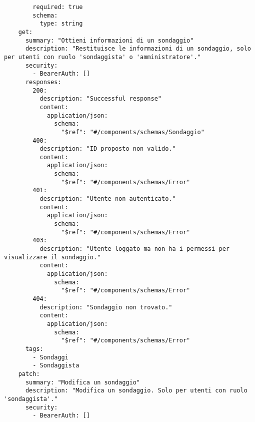 \begin{verbatim}
        required: true
        schema:
          type: string
    get: 
      summary: "Ottieni informazioni di un sondaggio"
      description: "Restituisce le informazioni di un sondaggio, solo per utenti con ruolo 'sondaggista' o 'amministratore'."
      security:
        - BearerAuth: []
      responses:
        200:
          description: "Successful response"
          content:
            application/json:
              schema:
                "$ref": "#/components/schemas/Sondaggio"
        400: 
          description: "ID proposto non valido."
          content:
            application/json:
              schema:
                "$ref": "#/components/schemas/Error"
        401:
          description: "Utente non autenticato."
          content:
            application/json:
              schema:
                "$ref": "#/components/schemas/Error"
        403:
          description: "Utente loggato ma non ha i permessi per visualizzare il sondaggio."
          content:
            application/json:
              schema:
                "$ref": "#/components/schemas/Error"
        404:
          description: "Sondaggio non trovato."
          content:
            application/json:
              schema:
                "$ref": "#/components/schemas/Error"
      tags:
        - Sondaggi
        - Sondaggista
    patch: 
      summary: "Modifica un sondaggio"
      description: "Modifica un sondaggio. Solo per utenti con ruolo 'sondaggista'."
      security:
        - BearerAuth: []
      

\end{verbatim}
